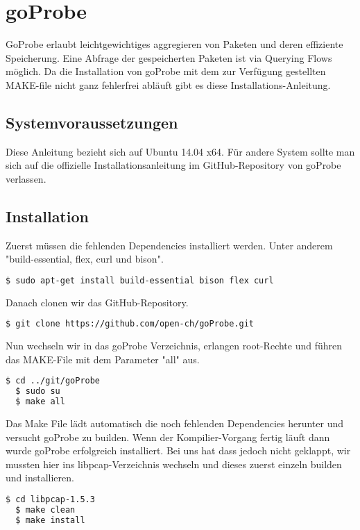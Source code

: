 \chapter{goProbe}
GoProbe erlaubt leichtgewichtiges aggregieren von Paketen und deren effiziente Speicherung. Eine Abfrage der gespeicherten Paketen ist via Querying Flows möglich.
Da die Installation von goProbe mit dem zur Verfügung gestellten MAKE-file nicht ganz fehlerfrei abläuft gibt es diese Installations-Anleitung.

\section{Systemvoraussetzungen}
Diese Anleitung bezieht sich auf Ubuntu 14.04 x64. Für andere System sollte man sich auf die offizielle Installationsanleitung im GitHub-Repository von goProbe verlassen.

\section{Installation}
Zuerst müssen die fehlenden Dependencies installiert werden. Unter anderem "build-essential, flex, curl und bison".

\begin{lstlisting}[language=bash]
  $ sudo apt-get install build-essential bison flex curl
\end{lstlisting}

Danach clonen wir das GitHub-Repository.

\begin{lstlisting}[language=bash]
  $ git clone https://github.com/open-ch/goProbe.git
\end{lstlisting}

Nun wechseln wir in das goProbe Verzeichnis, erlangen root-Rechte und führen das MAKE-File mit dem Parameter "all" aus.

\begin{lstlisting}[language=bash]
  $ cd ../git/goProbe
  $ sudo su
  $ make all
\end{lstlisting}

Das Make File lädt automatisch die noch fehlenden Dependencies herunter und versucht goProbe zu builden. Wenn der Kompilier-Vorgang fertig läuft dann wurde goProbe erfolgreich installiert. Bei uns hat dass jedoch nicht geklappt, wir mussten hier ins libpcap-Verzeichnis wechseln und dieses zuerst einzeln builden und installieren.

\begin{lstlisting}[language=bash]
  $ cd libpcap-1.5.3
  $ make clean
  $ make install
\end{lstlisting}

